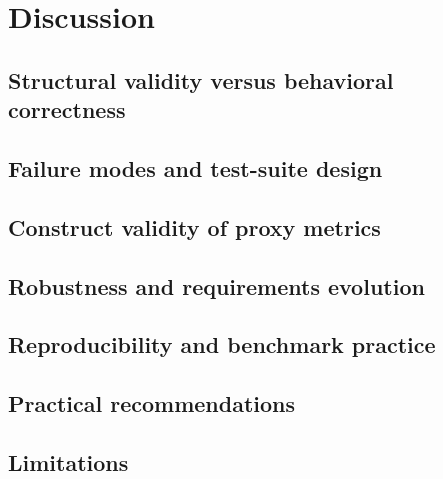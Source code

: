 \section{Discussion}
\label{sec:discussion}


\subsection{Structural validity versus behavioral correctness}
\label{sec:discussion:gap}

\subsection{Failure modes and test-suite design}
\label{sec:discussion:failures}

\subsection{Construct validity of proxy metrics}
\label{sec:discussion:proxies}

\subsection{Robustness and requirements evolution}
\label{sec:discussion:robustness}

\subsection{Reproducibility and benchmark practice}
\label{sec:discussion:reproducibility}

\subsection{Practical recommendations}
\label{sec:discussion:recommendations}

\subsection{Limitations}
\label{sec:discussion:limitations}
